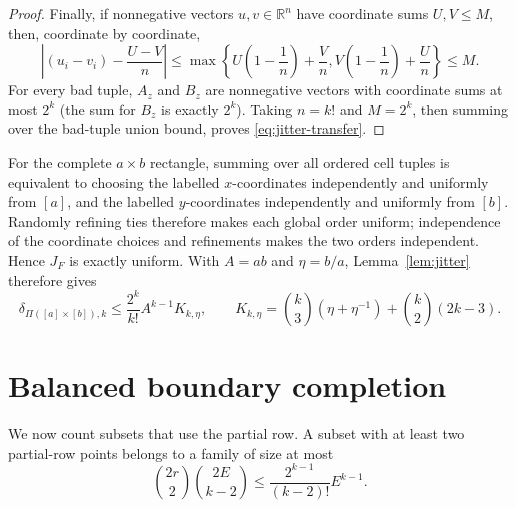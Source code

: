 \documentclass[11pt,letterpaper]{article}
\begin{document}
\begin{proof}
Finally, if nonnegative vectors $u,v\in\mathbb R^n$ have coordinate sums
$U,V\le M$, then, coordinate by coordinate,
\[
 \left|(u_i-v_i)-\frac{U-V}{n}\right|
 \le \max\left\{U\left(1-\frac1n\right)+\frac Vn,
                  V\left(1-\frac1n\right)+\frac Un\right\}
 \le M.
\]
For every bad tuple, $A_z$ and $B_z$ are nonnegative vectors with
coordinate sums at most $2^k$ (the sum for $B_z$ is exactly $2^k$).
Taking $n=k!$ and $M=2^k$, then summing over the bad-tuple union bound,
proves \eqref{eq:jitter-transfer}.
\end{proof}

For the complete $a\times b$ rectangle, summing over all ordered cell tuples
is equivalent to choosing the labelled $x$-coordinates independently and
uniformly from $[a]$, and the labelled $y$-coordinates independently and
uniformly from $[b]$.  Randomly refining ties therefore makes each global
order uniform; independence of the coordinate choices and refinements makes
the two orders independent.  Hence $J_F$ is exactly uniform.  With $A=ab$
and $\eta=b/a$, Lemma~\ref{lem:jitter} therefore gives
\begin{equation}
 \delta_{\Pi([a]\times[b]),k}
 \leq \frac{2^k}{k!}A^{k-1}K_{k,\eta},
 \qquad
 K_{k,\eta}=\binom{k}{3}(\eta+\eta^{-1})
             +\binom{k}{2}(2k-3).
 \tag{4.3}\label{eq:jitter-rectangle}
\end{equation}

\section{Balanced boundary completion}\label{sec:boundary}

We now count subsets that use the partial row.  A subset with at least
two partial-row points belongs to a family of size at most
\begin{equation}\label{eq:two-partial}
 \binom{2r}{2}\binom{2E}{k-2}
 \leq\frac{2^{k-1}}{(k-2)!}E^{k-1}.
\end{equation}
\end{document}
